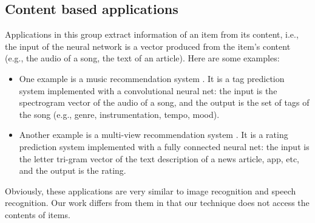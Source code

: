 \documentclass[letterpaper]{article}
\begin{document}
\subsection{Content based applications}
Applications in this group extract information of an item from its content, 
i.e., the input of the neural network is a vector produced from the item's 
content (e.g., the audio of a song, the text of an article). Here are some 
examples:
\begin{itemize}
	\item One example is a music recommendation system 
	\citeauthor{van2013deep}. 
	It is a tag prediction system implemented with a convolutional neural net: 
	the input is the spectrogram vector of the audio of a song, and the output 
	is the set of tags of the song (e.g., genre, instrumentation, tempo, mood).
	\item Another example is a multi-view recommendation system 
	\citeauthor{elkahky2015multi}. 
	It is a rating prediction system implemented with a fully connected neural 
	net: the input is the letter tri-gram vector of the text description of a 
	news article, app, etc, and the output is the rating.
\end{itemize}
Obviously, these applications are very similar to image recognition and speech 
recognition.
Our work differs from them in that our technique does not access the contents 
of items.
\end{document}
